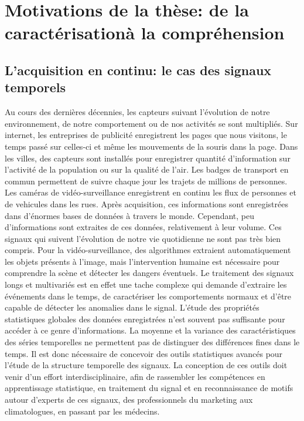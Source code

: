 \documentclass[../thesis.tex]{subfiles}
\begin{document}

\section[Motivations de la thèse: de la caractérisation à la compréhension]{%
		 Motivations de la thèse: de la caractérisation\linebreak[1] à la compréhension%
		}
\label{sec:french:context}

\subsection{L'acquisition en continu: le cas des signaux temporels}
\label{sub:french:intro_ts}


	Au cours des dernières décennies, les capteurs suivant l'évolution de notre environnement,
	de notre comportement ou de nos activités se sont multipliés. Sur internet, les
	entreprises de publicité enregistrent les pages que nous visitons, le temps passé
	sur celles-ci et même les mouvements de la souris dans la page. Dans les villes, des
	capteurs sont installés pour enregistrer quantité d'information sur l'activité de la population
	ou sur la qualité de l'air. Les badges de transport en commun permettent de suivre chaque
	jour les trajets de millions de personnes. Les caméras de vidéo-surveillance enregistrent
	en continu les flux de personnes et de vehicules dans les rues. Après acquisition, ces
	informations sont enregistrées dans d'énormes bases de données à travers le monde. Cependant,
	peu d'informations sont extraites de ces données, relativement à leur volume. Ces signaux qui
	suivent l'évolution de notre vie quotidienne ne sont pas très bien compris. Pour la
	vidéo-surveillance, des algorithmes extraient automatiquement les objets présents à l'image,
	mais l'intervention humaine est nécessaire pour comprendre la scène et détecter les
	dangers éventuels. Le traitement des signaux longs et multivariés est en effet une
	tache complexe qui demande d'extraire les événements dans le temps, de caractériser
	les comportements normaux et d'être capable de détecter les anomalies dans le signal.
	L'étude des propriétés statistiques globales des données enregistrées n'est souvent
	pas suffisante pour accéder à ce genre d'informations. La moyenne et la variance
	des caractéristiques des séries temporelles ne permettent pas de distinguer des différences
	fines dans le temps. Il est donc nécessaire de concevoir des outils statistiques avancés
	pour l'étude de la structure temporelle des signaux. La conception de ces outils doit venir
	d'un effort interdisciplinaire, afin de rassembler les compétences en apprentissage statistique,
	en traitement du signal et en reconnaissance de motifs autour d'experts de ces signaux, des professionnels
	du marketing aux climatologues, en passant par les médecins.
\end{document}
